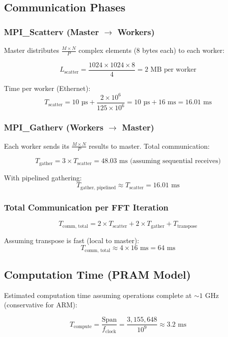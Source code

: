 \documentclass[11pt,a4paper]{article}
\begin{document}
\subsection{Communication Phases}

\subsubsection{MPI\_Scatterv (Master $\to$ Workers)}

Master distributes $\frac{M \times N}{P}$ complex elements (8 bytes each) to each worker:

\[
L_{\text{scatter}} = \frac{1024 \times 1024 \times 8}{4} = 2\text{ MB per worker}
\]

Time per worker (Ethernet):
\[
T_{\text{scatter}} = 10 \text{ µs} + \frac{2 \times 10^6}{125 \times 10^6} = 10 \text{ µs} + 16 \text{ ms} = 16.01 \text{ ms}
\]

\subsubsection{MPI\_Gatherv (Workers $\to$ Master)}

Each worker sends its $\frac{M \times N}{P}$ results to master. Total communication:

\[
T_{\text{gather}} = 3 \times T_{\text{scatter}} = 48.03 \text{ ms} \text{ (assuming sequential receives)}
\]

With pipelined gathering:
\[
T_{\text{gather, pipelined}} \approx T_{\text{scatter}} = 16.01 \text{ ms}
\]

\subsubsection{Total Communication per FFT Iteration}

\[
T_{\text{comm, total}} = 2 \times T_{\text{scatter}} + 2 \times T_{\text{gather}} + T_{\text{transpose}}
\]

Assuming transpose is fast (local to master):
\[
T_{\text{comm, total}} \approx 4 \times 16 \text{ ms} = 64 \text{ ms}
\]

\subsection{Computation Time (PRAM Model)}

Estimated computation time assuming operations complete at $\sim 1$ GHz (conservative for ARM):

\[
T_{\text{compute}} = \frac{\text{Span}}{f_{\text{clock}}} = \frac{3{,}155{,}648}{10^9} \approx 3.2 \text{ ms}
\]
\end{document}
